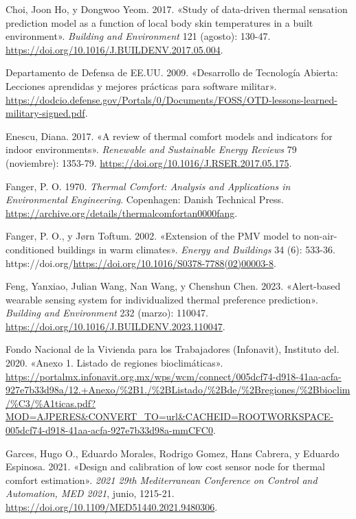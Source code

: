 \documentclass[
  12pt,
  letterpaper,
  DIV=11,
  numbers=noendperiod]{scrreport}
\newlength{\cslhangindent}
\newlength{\cslentryspacingunit} %
\newenvironment{CSLReferences}[2] %
 {%
  \setlength{\parindent}{0pt}
  \ifodd #1
  \let\oldpar\par
  \def\par{\hangindent=\cslhangindent\oldpar}
  \fi
  \setlength{\parskip}{#2\cslentryspacingunit}
 }%
 {}
\begin{document}
\begin{CSLReferences}{1}{0}
\leavevmode{}%
Choi, Joon Ho, y Dongwoo Yeom. 2017. {«Study of data-driven thermal
sensation prediction model as a function of local body skin temperatures
in a built environment»}. \emph{Building and Environment} 121 (agosto):
130-47. \url{https://doi.org/10.1016/J.BUILDENV.2017.05.004}.

\leavevmode{}%
Departamento de Defensa de EE.UU. 2009. {«{Desarrollo de Tecnología
Abierta: Lecciones aprendidas y mejores prácticas para software
militar}»}.
\url{https://dodcio.defense.gov/Portals/0/Documents/FOSS/OTD-lessons-learned-military-signed.pdf}.

\leavevmode{}%
Enescu, Diana. 2017. {«A review of thermal comfort models and indicators
for indoor environments»}. \emph{Renewable and Sustainable Energy
Reviews} 79 (noviembre): 1353-79.
\url{https://doi.org/10.1016/J.RSER.2017.05.175}.

\leavevmode{}%
Fanger, P. O. 1970. \emph{Thermal Comfort: Analysis and Applications in
Environmental Engineering}. Copenhagen: Danish Technical Press.
\url{https://archive.org/details/thermalcomfortan0000fang}.

\leavevmode{}%
Fanger, P. O., y Jørn Toftum. 2002. {«Extension of the PMV model to
non-air-conditioned buildings in warm climates»}. \emph{Energy and
Buildings} 34 (6): 533-36.
https://doi.org/\url{https://doi.org/10.1016/S0378-7788(02)00003-8}.

\leavevmode{}%
Feng, Yanxiao, Julian Wang, Nan Wang, y Chenshun Chen. 2023.
{«Alert-based wearable sensing system for individualized thermal
preference prediction»}. \emph{Building and Environment} 232 (marzo):
110047. \url{https://doi.org/10.1016/J.BUILDENV.2023.110047}.

\leavevmode{}%
Fondo Nacional de la Vivienda para los Trabajadores (Infonavit),
Instituto del. 2020. {«Anexo 1. Listado de regiones bioclimáticas»}.
\url{https://portalmx.infonavit.org.mx/wps/wcm/connect/005dcf74-d918-41aa-acfa-927e7b33d98a/12.+Anexo/\%2B1./\%2BListado/\%2Bde/\%2Bregiones/\%2Bbioclim/\%C3/\%A1ticas.pdf?MOD=AJPERES\&CONVERT_TO=url\&CACHEID=ROOTWORKSPACE-005dcf74-d918-41aa-acfa-927e7b33d98a-mmCFC0}.

\leavevmode{}%
Garces, Hugo O., Eduardo Morales, Rodrigo Gomez, Hans Cabrera, y Eduardo
Espinosa. 2021. {«Design and calibration of low cost sensor node for
thermal comfort estimation»}. \emph{2021 29th Mediterranean Conference
on Control and Automation, MED 2021}, junio, 1215-21.
\url{https://doi.org/10.1109/MED51440.2021.9480306}.


\end{CSLReferences}
\end{document}
